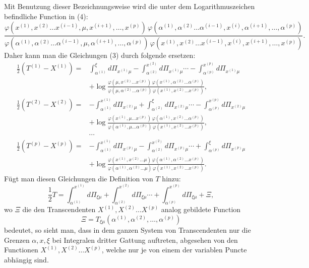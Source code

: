 \documentclass[10pt]{article}
\begin{document}
Mit Benutzung dieser Bezeichnungsweise wird die unter dem Logarithmuszeichen befindliche Function in (4):
\begingroup\scriptsize
\[
\frac{\varphi(x^{(1)},x^{(2)}\ldots x^{(i-1)},\mu,x^{(i+1)},\ldots,x^{(p)})\,
\varphi(\alpha^{(1)},\alpha^{(2)}\ldots\alpha^{(i-1)},x^{(i)},\alpha^{(i+1)},\ldots,\alpha^{(p)})}
{\varphi(\alpha^{(1)},\alpha^{(2)}\ldots\alpha^{(i-1)},\mu,\alpha^{(i+1)},\ldots,\alpha^{(p)})\,
\varphi(x^{(1)},x^{(2)}\ldots x^{(i-1)},x^{(i)},x^{(i+1)},\ldots,x^{(p)})}.
\]
\endgroup
Daher kann man die Gleichungen (3) durch folgende ersetzen:
\begingroup\scriptsize
\[
\begin{aligned}
\frac12(T^{(1)}-X^{(1)})={}&\int_{\alpha^{(1)}}^{\xi}d\Pi_{x^{(1)}\mu}
-\int_{\alpha^{(2)}}^{x^{(2)}}d\Pi_{x^{(1)}\mu}\cdots
-\int_{\alpha^{(p)}}^{x^{(p)}}d\Pi_{x^{(1)}\mu} \\
&+\log\frac{\varphi(\mu,x^{(2)}\ldots x^{(p)})\,\varphi(x^{(1)},\alpha^{(2)}\ldots\alpha^{(p)})}
{\varphi(\mu,\alpha^{(2)}\ldots\alpha^{(p)})\,\varphi(x^{(1)},x^{(2)}\ldots x^{(p)})},\\[0.4em]
\frac12(T^{(2)}-X^{(2)})={}&-\int_{\alpha^{(1)}}^{x^{(1)}}d\Pi_{x^{(2)}\mu}
+\int_{\alpha^{(2)}}^{\xi}d\Pi_{x^{(2)}\mu}\cdots
-\int_{\alpha^{(p)}}^{x^{(p)}}d\Pi_{x^{(2)}\mu} \\
&+\log\frac{\varphi(x^{(1)},\mu\ldots x^{(p)})\,\varphi(\alpha^{(1)},x^{(2)}\ldots\alpha^{(p)})}
{\varphi(\alpha^{(1)},\mu\ldots\alpha^{(p)})\,\varphi(x^{(1)},x^{(2)}\ldots x^{(p)})},\\[-0.2em]
&\cdots\\[-0.2em]
\frac12(T^{(p)}-X^{(p)})={}&-\int_{\alpha^{(1)}}^{x^{(1)}}d\Pi_{x^{(p)}\mu}
-\int_{\alpha^{(2)}}^{x^{(2)}}d\Pi_{x^{(p)}\mu}\cdots
+\int_{\alpha^{(p)}}^{\xi}d\Pi_{x^{(p)}\mu} \\
&+\log\frac{\varphi(x^{(1)},x^{(2)}\ldots\mu)\,\varphi(\alpha^{(1)},\alpha^{(2)}\ldots x^{(p)})}
{\varphi(\alpha^{(1)},\alpha^{(2)}\ldots\mu)\,\varphi(x^{(1)},x^{(2)}\ldots x^{(p)})}.
\end{aligned}
\]
\endgroup
Fügt man diesen Gleichungen die Definition von \(T\) hinzu:
\[
\frac12T=\int_{\alpha^{(1)}}^{x^{(1)}}d\Pi_{\xi\mu}
+\int_{\alpha^{(2)}}^{x^{(2)}}d\Pi_{\xi\mu}\cdots
+\int_{\alpha^{(p)}}^{x^{(p)}}d\Pi_{\xi\mu}+\Xi,
\]
wo \(\Xi\) die den Transcendenten \(X^{(1)},X^{(2)}\ldots X^{(p)}\) analog gebildete Function
\[
\Xi=T_{\xi\mu}(\alpha^{(1)},\alpha^{(2)},\ldots,\alpha^{(p)})
\]
bedeutet, so sieht man, dass in dem ganzen System von Transcendenten nur die Grenzen \(\alpha,x,\xi\) bei Integralen dritter Gattung auftreten, abgesehen von den Functionen \(X^{(1)},X^{(2)}\ldots X^{(p)}\), welche nur je von einem der variablen Puncte abhängig sind.
\end{document}
